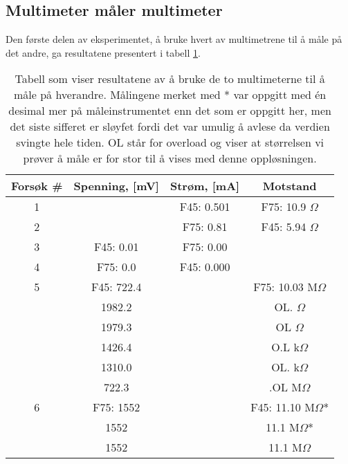 \documentclass[reprint, english,notitlepage]{revtex4-1}  %
\begin{document}
\subsection{Multimeter måler multimeter}
Den første delen av eksperimentet, å bruke hvert av multimetrene til å måle på det andre, ga resultatene presentert i tabell \ref{table:multimetre}.

\begin{table}[p]
\label{table:multimetre}
\caption{Tabell som viser resultatene av å bruke de to multimeterne til å måle på hverandre. Målingene merket med * var oppgitt med én desimal mer på måleinstrumentet enn det som er oppgitt her, men det siste sifferet er sløyfet fordi det var umulig å avlese da verdien svingte hele tiden. OL står for overload og viser at størrelsen vi prøver å måle er for stor til å vises med denne oppløsningen.}

\begin{adjustbox}{width=\linewidth}
\begin{tabular}{||c || c | c | c||}
\hline
Forsøk \# & Spenning, [mV] & Strøm, [mA] & Motstand  \\ \hline\hline
1 &            & F45: 0.501 & F75: 10.9 $\Omega$    \\ \hline
2 &            & F75: 0.81  & F45: 5.94 $\Omega$    \\ \hline
3 & F45: 0.01  & F75: 0.00  &                       \\ \hline
4 & F75: 0.0   & F45: 0.000 &                       \\ \hline
5 & F45: 722.4 &            & F75: 10.03 M$\Omega$  \\ \hline
  &     1982.2 &            &        OL. $\Omega$   \\ \hline
  &     1979.3 &            &        OL $\Omega$    \\ \hline
  &     1426.4 &            &        O.L k$\Omega$  \\ \hline
  &     1310.0 &            &        OL. k$\Omega$  \\ \hline
  &      722.3 &            &        .OL  M$\Omega$ \\ \hline
6 & F75:  1552 &            & F45: 11.10 M$\Omega$*  \\ \hline
  &       1552 &            & 11.1 M$\Omega$*        \\ \hline
  &       1552 &            & 11.1 M$\Omega$         \\ \hline
\end{tabular}
\end{adjustbox}
\end{table}
\end{document}
